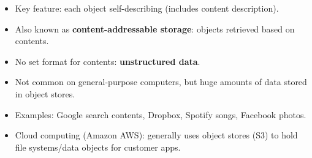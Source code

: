 \begin{itemize}
    \item Key feature: each object self-describing (includes content description).
    \item Also known as \textbf{content-addressable storage}: objects retrieved based on contents.
    \item No set format for contents: \textbf{unstructured data}.
    \item Not common on general-purpose computers, but huge amounts of data stored in object stores.
    \item Examples: Google search contents, Dropbox, Spotify songs, Facebook photos.
    \item Cloud computing (Amazon AWS): generally uses object stores (S3) to hold file systems/data objects for customer apps.
\end{itemize}

